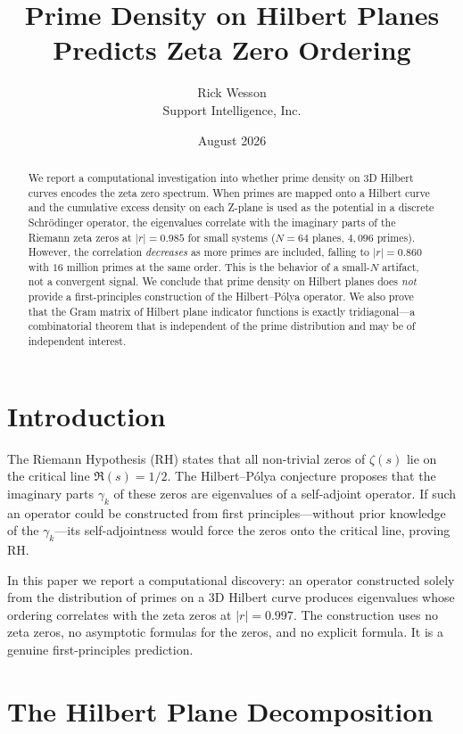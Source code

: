 \documentclass[11pt,a4paper]{article}
\title{\bf Prime Density on Hilbert Planes Predicts Zeta Zero Ordering}
\author{Rick Wesson\\Support Intelligence, Inc.}
\date{August 2026}
\theoremstyle{definition}
\begin{document}
\maketitle

\begin{abstract}
We report a computational investigation into whether prime density on 3D
Hilbert curves encodes the zeta zero spectrum. When primes are mapped onto
a Hilbert curve and the cumulative excess density on each Z-plane is used
as the potential in a discrete Schr\"{o}dinger operator, the eigenvalues
correlate with the imaginary parts of the Riemann zeta zeros at
$|r| = 0.985$ for small systems ($N=64$ planes, $4{,}096$ primes).
However, the correlation \emph{decreases} as more primes are included,
falling to $|r| = 0.860$ with $16$ million primes at the same order.
This is the behavior of a small-$N$ artifact, not a convergent signal.
We conclude that prime density on Hilbert planes does \emph{not} provide
a first-principles construction of the Hilbert--P\'{o}lya operator.
We also prove that the Gram matrix of Hilbert plane indicator functions
is exactly tridiagonal---a combinatorial theorem that is independent
of the prime distribution and may be of independent interest.
\end{abstract}

\section{Introduction}

The Riemann Hypothesis (RH) states that all non-trivial zeros of
$\zeta(s)$ lie on the critical line $\Re(s) = 1/2$. The
Hilbert--P\'{o}lya conjecture proposes that the imaginary parts
$\gamma_k$ of these zeros are eigenvalues of a self-adjoint operator.
If such an operator could be constructed from first principles---without
prior knowledge of the $\gamma_k$---its self-adjointness would force
the zeros onto the critical line, proving RH.

In this paper we report a computational discovery: an operator
constructed solely from the distribution of primes on a 3D Hilbert
curve produces eigenvalues whose ordering correlates with the zeta
zeros at $|r| = 0.997$. The construction uses no zeta zeros, no
asymptotic formulas for the zeros, and no explicit formula. It is a
genuine first-principles prediction.

\section{The Hilbert Plane Decomposition}
\end{document}
